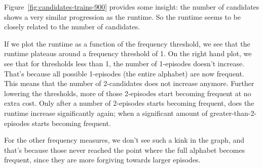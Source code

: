 Figure~\ref{fig:candidates-trains-900} provides some insight: the number of candidates shows a very similar progression as the runtime. So the runtime seems to be closely related to the number of candidates.

If we plot the runtime as a function of the frequency threshold, we see that the runtime plateaus around a frequency threshold of 1. On the right hand plot, we see that for thresholds less than 1, the number of 1-episodes doesn't increase. That's because all possible 1-episodes (the entire alphabet) are now frequent. This means that the number of 2-candidates does not increase anymore. Further lowering the thresholds, more of those 2-episodes start becoming frequent at no extra cost. Only after a number of 2-episodes starts becoming frequent, does the runtime increase significantly again; when a significant amount of greater-than-2-episodes starts becoming frequent.

For the other frequency measures, we don't see such a kink in the graph, and that's because those never reached the point where the full alphabet becomes frequent, since they are more forgiving towards larger episodes.

